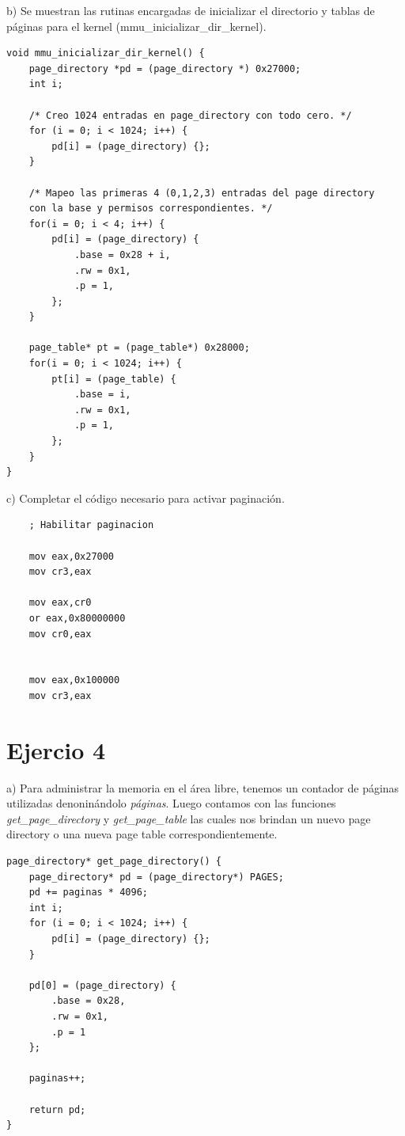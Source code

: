 \documentclass[a4paper]{article}
\begin{document}
{\large b)} Se muestran las rutinas encargadas de inicializar el directorio y tablas de p\'aginas para el kernel
(mmu_inicializar_dir_kernel). 

\begin{codesnippet}
\begin{verbatim}
void mmu_inicializar_dir_kernel() {
    page_directory *pd = (page_directory *) 0x27000;
    int i;

    /* Creo 1024 entradas en page_directory con todo cero. */
    for (i = 0; i < 1024; i++) {
        pd[i] = (page_directory) {};
    }

    /* Mapeo las primeras 4 (0,1,2,3) entradas del page directory
    con la base y permisos correspondientes. */
    for(i = 0; i < 4; i++) {
        pd[i] = (page_directory) {
            .base = 0x28 + i,
            .rw = 0x1,
            .p = 1,
        };
    }

    page_table* pt = (page_table*) 0x28000;
    for(i = 0; i < 1024; i++) {
        pt[i] = (page_table) {
            .base = i,
            .rw = 0x1,
            .p = 1,
        };
    }
}
\end{verbatim}
\end{codesnippet}



{\large c)} Completar el c\'odigo necesario para activar paginaci\'on.\\

\begin{codesnippet}
\begin{verbatim}
    ; Habilitar paginacion

    mov eax,0x27000
    mov cr3,eax

    mov eax,cr0
    or eax,0x80000000
    mov cr0,eax


    mov eax,0x100000
    mov cr3,eax
\end{verbatim}
\end{codesnippet}

\newpage
\section{Ejercio 4}
{\large a)} Para administrar la memoria en el área libre, tenemos un contador de páginas utilizadas denoninándolo \textit{páginas}. Luego contamos con las funciones \textit{get_page_directory} y \textit{get_page_table} las cuales nos brindan un nuevo page directory o una nueva page table correspondientemente.


\begin{codesnippet}
\begin{verbatim}
page_directory* get_page_directory() {
    page_directory* pd = (page_directory*) PAGES;
    pd += paginas * 4096;
    int i;
    for (i = 0; i < 1024; i++) {
        pd[i] = (page_directory) {};
    }

    pd[0] = (page_directory) {
        .base = 0x28,
        .rw = 0x1,
        .p = 1
    };

    paginas++;

    return pd;
}
\end{verbatim}
\end{codesnippet}
\end{document}
